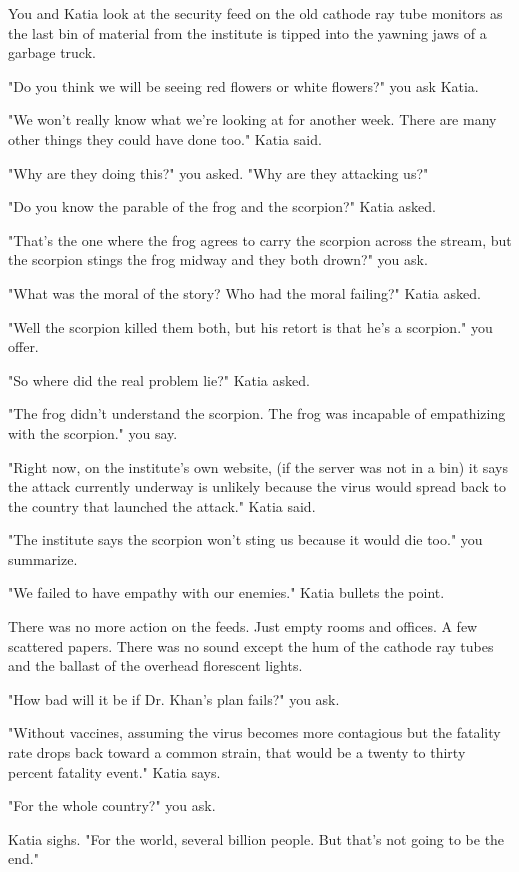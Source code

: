 \documentclass[a5paper, symmetric]{tufte-book}
\begin{document}
You and Katia look at the security feed on the old cathode ray tube monitors as the last bin of material from the institute is tipped into the yawning jaws of a garbage truck.

"Do you think we will be seeing red flowers or white flowers?" you ask Katia. 

"We won't really know what we're looking at for another week. There are many other things they could have done too." Katia said. 

"Why are they doing this?" you asked. "Why are they attacking us?"

"Do you know the parable of the frog and the scorpion?" Katia asked. 

"That's the one where the frog agrees to carry the scorpion across the stream, but the scorpion stings the frog midway and they both drown?" you ask. 

"What was the moral of the story? Who had the moral failing?" Katia asked. 

"Well the scorpion killed them both, but his retort is that he's a scorpion." you offer. 

"So where did the real problem lie?" Katia asked. 

"The frog didn't understand the scorpion. The frog was incapable of empathizing with the scorpion." you say. 

"Right now, on the institute's own website, (if the server was not in a bin) it says the attack currently underway is unlikely because the virus would spread back to the country that launched the attack." Katia said. 

"The institute says the scorpion won't sting us because it would die too." you summarize. 

"We failed to have empathy with our enemies." Katia bullets the point.

There was no more action on the feeds. Just empty rooms and offices. A few scattered papers. There was no sound except the hum of the cathode ray tubes and the ballast of the overhead florescent lights.

"How bad will it be if Dr. Khan's plan fails?" you ask.

"Without vaccines, assuming the virus becomes more contagious but the fatality rate drops back toward a common strain, that would be a twenty to thirty percent fatality event." Katia says. 

"For the whole country?" you ask. 

Katia sighs. "For the world, several billion people. But that's not going to be the end." 
\end{document}
